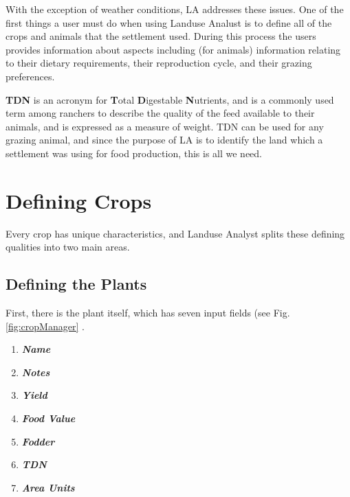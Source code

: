 With the exception of weather conditions, LA addresses these issues.  One of
the first things a user must do when using Landuse Analust is to define all
of the crops and animals that the settlement used.  During this process the
users provides information about aspects including (for animals) information
relating to their dietary requirements, their reproduction cycle, and their
grazing preferences.  


      \label{TDN}
    \textbf{TDN} is an acronym for \textbf{T}otal \textbf{D}igestable
    \textbf{N}utrients, and is a commonly used term among ranchers to describe
    the quality of the feed available to their animals, and is expressed as a
    measure of weight.  TDN can be used for any grazing animal, and since the purpose of LA is to identify the land which a settlement was using for food production, this is all we need.


\section{Defining Crops}Every crop has unique
characteristics, and Landuse Analyst splits these defining qualities into two
main areas.
  \subsection{Defining the Plants}First, there is
the plant itself, which has seven input fields (see Fig. \ref{fig:cropManager} .
    \begin{enumerate}
      \item \textbf{\textit{Name}}

      \item \textbf{\textit{Notes}}

      \item \textbf{\textit{Yield}}

      \item \textbf{\textit{Food Value}}

      \item \textbf{\textit{Fodder}}

      \item \textbf{\textit{TDN}}

      \item \textbf{\textit{Area Units}}
    \end{enumerate}

